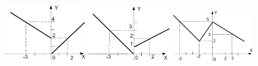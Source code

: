 \begin{figure}%
\begin{floatrow}[3]
{\includegraphics[width=0.32\textwidth,keepaspectratio]{img/ris_3_48}}
{\includegraphics[width=0.32\textwidth,keepaspectratio]{img/ris_3_49}}
{\includegraphics[width=0.32\textwidth,keepaspectratio]{img/ris_3_50}}
\end{floatrow}
\end{figure}%

